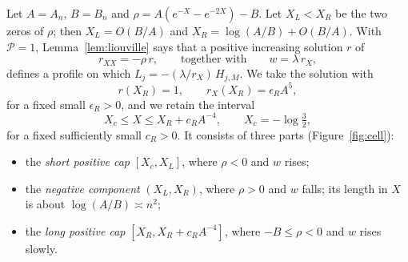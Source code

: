 Let $A=A_n$, $B=B_n$ and $\rho=A(e^{-X}-e^{-2X})-B$. Let $X_L<X_R$ be
the two zeros of $\rho$; then $X_L=O(B/A)$ and
$X_R=\log(A/B)+O(B/A)$. With $\mathcal P=1$, Lemma~\ref{lem:liouville}
says that a positive increasing solution $r$ of
\begin{equation}\label{eq:rad-eq-rm4}
 r_{XX}=-\rho\,r,\qquad\text{together with}\qquad w=\lambda\,r_X,
\end{equation}
defines a profile on which $L_j=-(\lambda/r_X)\,H_{j,M}$. We take the
solution with
\[
 r(X_R)=1,\qquad r_X(X_R)=\epsilon_RA^5,
\]
for a fixed small $\epsilon_R>0$, and we retain the interval
\[
 X_c\le X\le X_R+c_RA^{-4},\qquad X_c=-\log\tfrac32,
\]
for a fixed sufficiently small $c_R>0$. It consists of three parts
(Figure~\ref{fig:cell}):
\begin{itemize}
\item the \emph{short positive cap} $[X_c,X_L]$, where $\rho<0$ and
 $w$ rises;
\item the \emph{negative component} $(X_L,X_R)$, where $\rho>0$ and
 $w$ falls; its length in $X$ is about $\log(A/B)\asymp n^2$;
\item the \emph{long positive cap} $[X_R,X_R+c_RA^{-4}]$, where
 $-B\le\rho<0$ and $w$ rises slowly.
\end{itemize}

